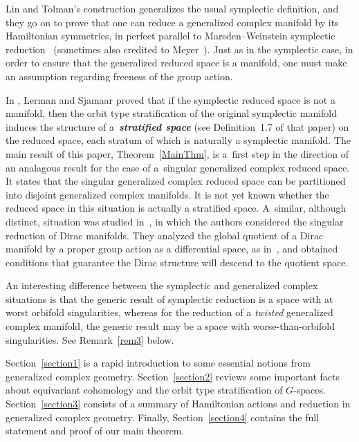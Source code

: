 \documentclass[pdftex]{sigma}
\numberwithin{equation}{section}
\newcommand{\deff}[1]{\textbf{\emph{#1}}}
\begin{document}
Lin and Tolman's construction generalizes the usual symplectic def\/inition, and they go on to prove that one can reduce a generalized complex manifold by its Hamiltonian symmetries, in perfect parallel to Marsden--Weinstein symplectic reduction~\cite{reduction}  (sometimes also credited to Meyer~\cite{meyer}).  Just as in the symplectic case, in order to ensure that the generalized reduced space is a manifold, one must make an assumption regarding freeness of the group action.

In \cite{stratified}, Lerman and Sjamaar proved that if the symplectic reduced space is not a manifold, then the orbit type stratif\/ication of the original symplectic manifold induces the structure of a~\deff{stratified space} (see Def\/inition~1.7 of that paper) on the reduced space, each stratum of which is naturally a symplectic manifold.  The main result of this paper, Theorem~\ref{MainThm}, is a~f\/irst step in the direction of an analagous result for the case of a~singular generalized complex reduced space.  It states that the singular generalized complex reduced space can be partitioned into disjoint generalized complex manifolds.  It is not yet known whether the reduced space in this situation is actually a stratif\/ied space.  A~similar, although distinct, situation was studied in~\cite{SingularDiracReduction}, in which the authors considered the singular reduction of Dirac manifolds.  They analyzed the global quotient of a Dirac manifold by a proper group action as a dif\/ferential space, as in~\cite{MR1848504}, and obtained conditions that guarantee the Dirac structure will descend to the quotient space.

An interesting dif\/ference between the symplectic and generalized complex situations is that the generic result of symplectic reduction is a space with at worst orbifold singularities, whereas for the reduction of a \emph{twisted} generalized complex manifold, the generic result may be a space with worse-than-orbifold singularities.  See Remark~\ref{rem3} below.


Section~\ref{section1} is a rapid introduction to some essential notions from generalized complex geo\-met\-ry.  Section~\ref{section2} reviews some important facts about equivariant cohomology and the orbit type stratif\/ication of $G$-spaces.  Section~\ref{section3} consists of a summary of Hamiltonian actions and reduction in generalized complex geometry.  Finally, Section~\ref{section4} contains the full statement and proof of our main theorem.
\end{document}
